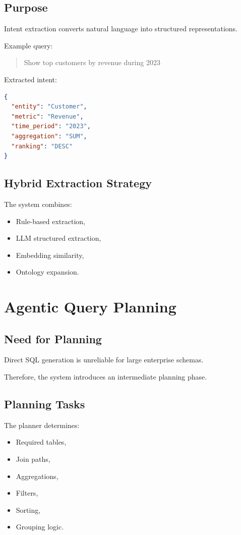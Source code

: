 \documentclass[11pt,a4paper]{article}
\begin{document}
\subsection{Purpose}

Intent extraction converts natural language into structured representations.

Example query:

\begin{quote}
Show top customers by revenue during 2023
\end{quote}

Extracted intent:

\begin{lstlisting}[language=json]
{
  "entity": "Customer",
  "metric": "Revenue",
  "time_period": "2023",
  "aggregation": "SUM",
  "ranking": "DESC"
}
\end{lstlisting}

\subsection{Hybrid Extraction Strategy}

The system combines:
\begin{itemize}
    \item Rule-based extraction,
    \item LLM structured extraction,
    \item Embedding similarity,
    \item Ontology expansion.
\end{itemize}

\section{Agentic Query Planning}

\subsection{Need for Planning}

Direct SQL generation is unreliable for large enterprise schemas.

Therefore, the system introduces an intermediate planning phase.

\subsection{Planning Tasks}

The planner determines:
\begin{itemize}
    \item Required tables,
    \item Join paths,
    \item Aggregations,
    \item Filters,
    \item Sorting,
    \item Grouping logic.
\end{itemize}
\end{document}
